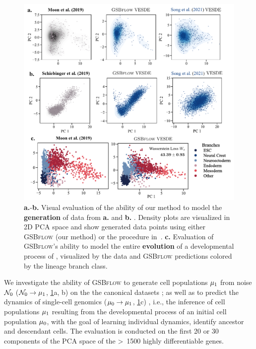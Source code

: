 \begin{figure}
     \centering
     \includegraphics[width=\textwidth]{figures/fig_all_predictions.pdf}
    \caption{\textbf{a.}-\textbf{b.} Visual evaluation of the ability of our method to model the \textbf{generation} of data from \textbf{a.} \citet{moon2019visualizing} and \textbf{b.} \citet{schiebinger2019optimal}. Density plots are visualized in 2D PCA space and show generated data points using either \textsc{GSBflow} (our method) or the procedure in~\citet{song2020score}. \textbf{c.} Evaluation of \textsc{GSBflow}'s ability to model the entire \textbf{evolution} of a developmental process of \citet{moon2019visualizing}, visualized by the data and \textsc{GSBflow} predictions colored by the lineage branch class.}
    \label{fig:all_results}
\end{figure}

 We investigate the ability of \textsc{GSBflow} to generate cell populations $\mu_1$ from noise $\mathcal{N}_0$ ($\mathcal{N}_0 \rightarrow \mu_1$, \cref{fig:all_results}a, b) on the the canonical datasets \citep{moon2019visualizing, schiebinger2019optimal}; as well as to predict the dynamics of single-cell genomics ($\mu_0 \rightarrow \mu_1$, \cref{fig:all_results}c) \citep{moon2019visualizing}, i.e., the inference of cell populations $\mu_1$ resulting from the developmental process of an initial cell population $\mu_0$, with the goal of learning individual dynamics, identify ancestor and descendant cells. 
The evaluation is conducted on the first 20 or 30 components of the PCA space of the >~1500 highly differentiable genes.

